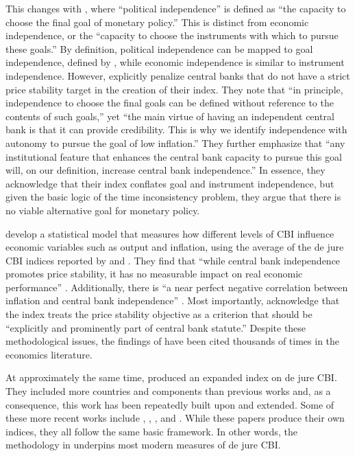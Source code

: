 \documentclass[12pt,a4paper]{article}
\begin{document}
\begin{doublespace}
This changes with \textcite[366]{grilli_political_1991}, where ``political independence'' is defined as ``the capacity to choose the final goal of monetary policy.'' This is distinct from economic independence, or the ``capacity to choose the instruments with which to pursue these goals.'' By definition, political independence can be mapped to goal independence, defined by \textcite{debelle_how_1994}, while economic independence is similar to instrument independence. However, \textcite[367]{grilli_political_1991} explicitly penalize central banks that do not have a strict price stability target in the creation of their index. They note that ``in principle, independence to choose the final goals can be defined without reference to the contents of such goals,'' yet ``the main virtue of having an independent central bank is that it can provide credibility. This is why we identify independence with autonomy to pursue the goal of low inflation.'' They further emphasize that ``any institutional feature that enhances the central bank capacity to pursue this goal will, on our definition, increase central bank independence.'' In essence, they acknowledge that their index conflates goal and instrument independence, but given the basic logic of the time inconsistency problem, they argue that there is no viable alternative goal for monetary policy.


\textcite{alesina_central_1993} develop a statistical model that measures how different levels of CBI influence economic variables such as output and inflation, using the average of the de jure CBI indices reported by \textcite{alesina_macroeconomics_1988} and \textcite{grilli_political_1991}. They find that ``while central bank independence promotes price stability, it has no measurable impact on real economic performance'' \parencite[151]{alesina_central_1993}. Additionally, there is ``a near perfect negative correlation between inflation and central bank independence'' \parencite[154]{alesina_central_1993}. Most importantly, \textcite[153]{alesina_central_1993} acknowledge that the \textcite{grilli_political_1991} index treats the price stability objective as a criterion that should be ``explicitly and prominently part of central bank statute.'' Despite these methodological issues, the findings of \textcite{alesina_central_1993} have been cited thousands of times in the economics literature.


At approximately the same time, \textcite{cukierman_measuring_1992} produced an expanded index on de jure CBI. They included more countries and components than previous works and, as a consequence, this work has been repeatedly built upon and extended. Some of these more recent works include \textcite{romelli_political_2022}, \textcite{romelli_trends_2024}, \textcite{dincer_central_2024}, and \textcite{garriga_revisiting_2025}. While these papers produce their own indices, they all follow the same basic framework. In other words, the methodology in \textcite{cukierman_measuring_1992} underpins most modern measures of de jure CBI. 


\end{doublespace}
\end{document}
